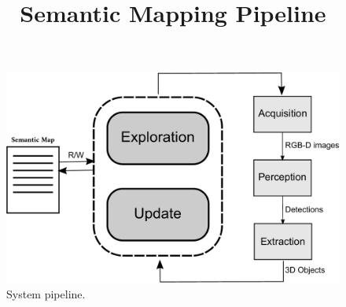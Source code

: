 \documentclass{article}
\title{\LARGE \bf Semantic Mapping Pipeline}
\begin{document}
	
	\maketitle	
	
	\begin{figure}[htbp]
		\centering
		\includegraphics[width=\linewidth]{pics/drawing-crop.pdf}
		\caption{System pipeline.}
		\label{fig:pipeline}
	\end{figure}
	
	
	
\end{document}
